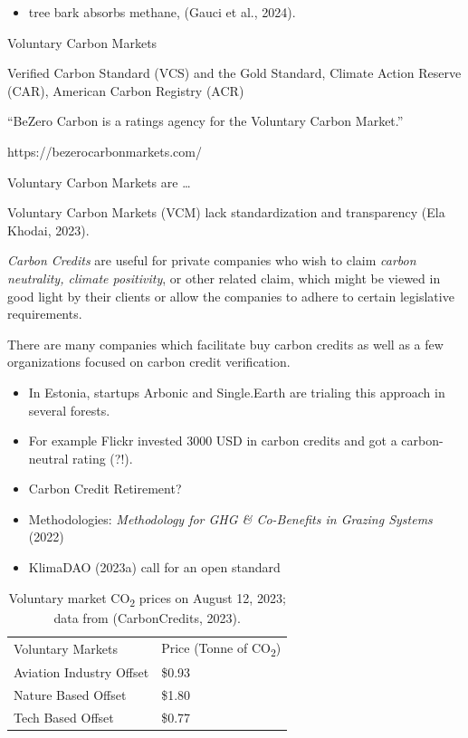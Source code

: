 \documentclass[
  letterpaper,
  DIV=11,
  numbers=noendperiod]{scrartcl}
\providecommand{\tightlist}{%
  \setlength{\itemsep}{0pt}\setlength{\parskip}{0pt}}\usepackage{longtable,booktabs,array}
\begin{document}
\begin{itemize}
\tightlist
\item
  tree bark absorbs methane, (Gauci et al., 2024).
\end{itemize}

Voluntary Carbon Markets

Verified Carbon Standard (VCS) and the Gold Standard, Climate Action
Reserve (CAR)‍, American Carbon Registry (ACR)

``BeZero Carbon is a ratings agency for the Voluntary Carbon Market.''

https://bezerocarbonmarkets.com/

Voluntary Carbon Markets are \ldots{}

Voluntary Carbon Markets (VCM) lack standardization and transparency
(Ela Khodai, 2023).

\emph{Carbon Credits} are useful for private companies who wish to claim
\emph{carbon neutrality, climate positivity}, or other related claim,
which might be viewed in good light by their clients or allow the
companies to adhere to certain legislative requirements.

There are many companies which facilitate buy carbon credits as well as
a few organizations focused on carbon credit verification.

\begin{itemize}
\tightlist
\item
  In Estonia, startups Arbonic and Single.Earth are trialing this
  approach in several forests.
\item
  For example Flickr invested 3000 USD in carbon credits and got a
  carbon-neutral rating (?!).
\item
  Carbon Credit Retirement?
\item
  Methodologies: \emph{Methodology for {GHG} \& {Co-Benefits} in
  {Grazing Systems}} (2022)
\item
  KlimaDAO (2023a) call for an open standard
\end{itemize}

\begin{longtable}[]{@{}ll@{}}
\caption{Voluntary market CO\textsubscript{2} prices on August 12, 2023;
data from (CarbonCredits, 2023).}\tabularnewline
\toprule\noalign{}
\endfirsthead
\endhead
\bottomrule\noalign{}
\endlastfoot
Voluntary Markets & Price (Tonne of CO\textsubscript{2}) \\
Aviation Industry Offset & \$0.93 \\
Nature Based Offset & \$1.80 \\
Tech Based Offset & \$0.77 \\
\end{longtable}
\end{document}
